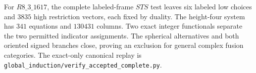 For $R8\_3\_1617$, the complete labeled-frame $STS$ test leaves six
labeled low choices and $3835$ high restriction vectors, each fixed by
duality. The height-four system has $341$ equations and $130431$ columns.
Two exact integer functionals separate the two permitted indicator
assignments. The spherical alternatives and both oriented signed
branches close, proving an exclusion for general complex fusion
categories. The exact-only canonical replay is
\texttt{global\_induction/verify\_accepted\_complete.py}.
